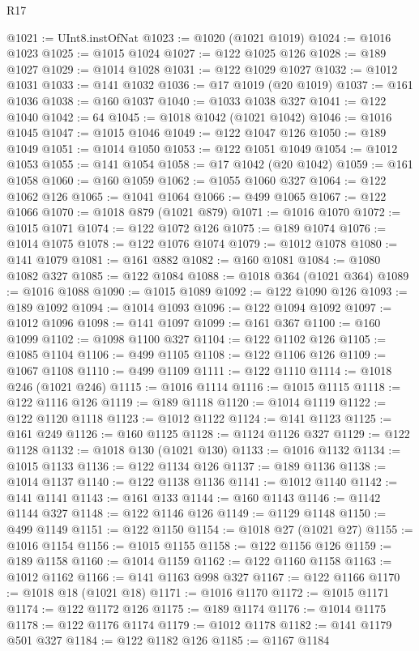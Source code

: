 \begin{lexlean}{R17}
\begin{coremodule}
{{{{{{{{{{{{{{{{{{{{{{{{{{{{{{{{{{{{{{{{{{{{{{{{{{{{{{{{{{{{{{{{{{{{{{{{{{{{{{{{{{{{{{{{{{{{{{{{{{{{{{{{{{{@1021 := UInt8.instOfNat
@1023 := @1020 (@1021 @1019)
@1024 := @1016 @1023
@1025 := @1015 @1024
@1027 := @122 @1025 @126
@1028 := @189 @1027
@1029 := @1014 @1028
@1031 := @122 @1029 @1027
@1032 := @1012 @1031
@1033 := @141 @1032
@1036 := @17 @1019 (@20 @1019)
@1037 := @161 @1036
@1038 := @160 @1037
@1040 := @1033 @1038 @327
@1041 := @122 @1040
@1042 := 64
@1045 := @1018 @1042 (@1021 @1042)
@1046 := @1016 @1045
@1047 := @1015 @1046
@1049 := @122 @1047 @126
@1050 := @189 @1049
@1051 := @1014 @1050
@1053 := @122 @1051 @1049
@1054 := @1012 @1053
@1055 := @141 @1054
@1058 := @17 @1042 (@20 @1042)
@1059 := @161 @1058
@1060 := @160 @1059
@1062 := @1055 @1060 @327
@1064 := @122 @1062 @126
@1065 := @1041 @1064
@1066 := @499 @1065
@1067 := @122 @1066
@1070 := @1018 @879 (@1021 @879)
@1071 := @1016 @1070
@1072 := @1015 @1071
@1074 := @122 @1072 @126
@1075 := @189 @1074
@1076 := @1014 @1075
@1078 := @122 @1076 @1074
@1079 := @1012 @1078
@1080 := @141 @1079
@1081 := @161 @882
@1082 := @160 @1081
@1084 := @1080 @1082 @327
@1085 := @122 @1084
@1088 := @1018 @364 (@1021 @364)
@1089 := @1016 @1088
@1090 := @1015 @1089
@1092 := @122 @1090 @126
@1093 := @189 @1092
@1094 := @1014 @1093
@1096 := @122 @1094 @1092
@1097 := @1012 @1096
@1098 := @141 @1097
@1099 := @161 @367
@1100 := @160 @1099
@1102 := @1098 @1100 @327
@1104 := @122 @1102 @126
@1105 := @1085 @1104
@1106 := @499 @1105
@1108 := @122 @1106 @126
@1109 := @1067 @1108
@1110 := @499 @1109
@1111 := @122 @1110
@1114 := @1018 @246 (@1021 @246)
@1115 := @1016 @1114
@1116 := @1015 @1115
@1118 := @122 @1116 @126
@1119 := @189 @1118
@1120 := @1014 @1119
@1122 := @122 @1120 @1118
@1123 := @1012 @1122
@1124 := @141 @1123
@1125 := @161 @249
@1126 := @160 @1125
@1128 := @1124 @1126 @327
@1129 := @122 @1128
@1132 := @1018 @130 (@1021 @130)
@1133 := @1016 @1132
@1134 := @1015 @1133
@1136 := @122 @1134 @126
@1137 := @189 @1136
@1138 := @1014 @1137
@1140 := @122 @1138 @1136
@1141 := @1012 @1140
@1142 := @141 @1141
@1143 := @161 @133
@1144 := @160 @1143
@1146 := @1142 @1144 @327
@1148 := @122 @1146 @126
@1149 := @1129 @1148
@1150 := @499 @1149
@1151 := @122 @1150
@1154 := @1018 @27 (@1021 @27)
@1155 := @1016 @1154
@1156 := @1015 @1155
@1158 := @122 @1156 @126
@1159 := @189 @1158
@1160 := @1014 @1159
@1162 := @122 @1160 @1158
@1163 := @1012 @1162
@1166 := @141 @1163 @998 @327
@1167 := @122 @1166
@1170 := @1018 @18 (@1021 @18)
@1171 := @1016 @1170
@1172 := @1015 @1171
@1174 := @122 @1172 @126
@1175 := @189 @1174
@1176 := @1014 @1175
@1178 := @122 @1176 @1174
@1179 := @1012 @1178
@1182 := @141 @1179 @501 @327
@1184 := @122 @1182 @126
@1185 := @1167 @1184
}}}}}}}}}}}}}}}}}}}}}}}}}}}}}}}}}}}}}}}}}}}}}}}}}}}}}}}}}}}}}}}}}}}}}}}}}}}}}}}}}}}}}}}}}}}}}}}}}}}}}}}}}}}
\end{coremodule}
\end{lexlean}
